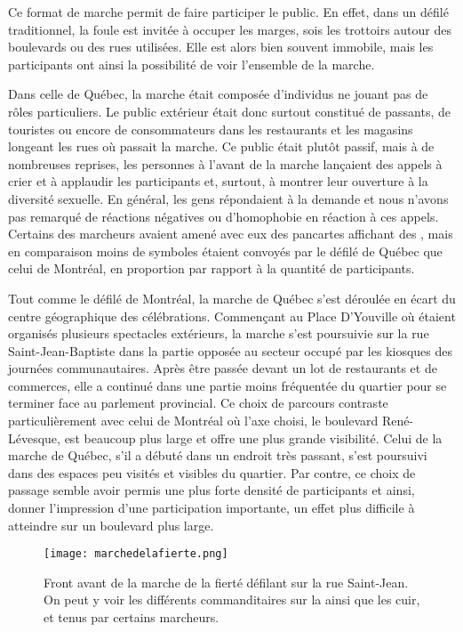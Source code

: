 Ce format de marche permit de faire participer le public.
En effet, dans un défilé traditionnel, la foule est invitée à occuper les marges, sois les trottoirs autour des boulevards ou des rues utilisées.
Elle est alors bien souvent immobile, mais les participants ont ainsi la possibilité de voir l'ensemble de la marche.

Dans celle de Québec, la marche était composée d'individus ne jouant pas de rôles particuliers.
Le public extérieur était donc surtout constitué de passants, de touristes ou encore de consommateurs dans les restaurants et les magasins longeant les rues où passait la marche.
Ce public était plutôt passif, mais à de nombreuses reprises, les personnes à l'avant de la marche lançaient des appels à crier et à applaudir les participants et, surtout, à montrer leur ouverture à la diversité sexuelle.
En général, les gens répondaient à la demande et nous n'avons pas remarqué de réactions négatives ou d'homophobie en réaction à ces appels.
Certains des marcheurs avaient amené avec eux des pancartes affichant des , mais en comparaison moins de symboles étaient convoyés par le défilé de Québec que celui de Montréal, en proportion par rapport à la quantité de participants.

Tout comme le défilé de Montréal, la marche de Québec s'est déroulée en écart du centre géographique des célébrations.
Commençant au Place D'Youville où étaient organisés plusieurs spectacles extérieurs, la marche s'est poursuivie sur la rue Saint-Jean-Baptiste dans la partie opposée au secteur occupé par les kiosques des journées communautaires.
Après être passée devant un lot de restaurants et de commerces, elle a continué dans une partie moins fréquentée du quartier pour se terminer face au parlement provincial.
Ce choix de parcours contraste particulièrement avec celui de Montréal où l'axe choisi, le boulevard René-Lévesque, est beaucoup plus large et offre une plus grande visibilité.
Celui de la marche de Québec, s'il a débuté dans un endroit très passant, s'est poursuivi dans des espaces peu visités et visibles du quartier.
Par contre, ce choix de passage semble avoir permis une plus forte densité de participants et ainsi, donner l'impression d'une participation importante, un effet plus difficile à atteindre sur un boulevard plus large.

\begin{figure}[ht]
 \centering
 \texttt{[image: marchedelafierte.png]}\caption[Marche de la fierté]{Front avant de la marche de la fierté défilant sur la rue Saint-Jean. On peut y voir les différents commanditaires sur la  ainsi que les  cuir,  et  tenus par certains marcheurs.\label{fig:marchedelafierte}}
\end{figure}

